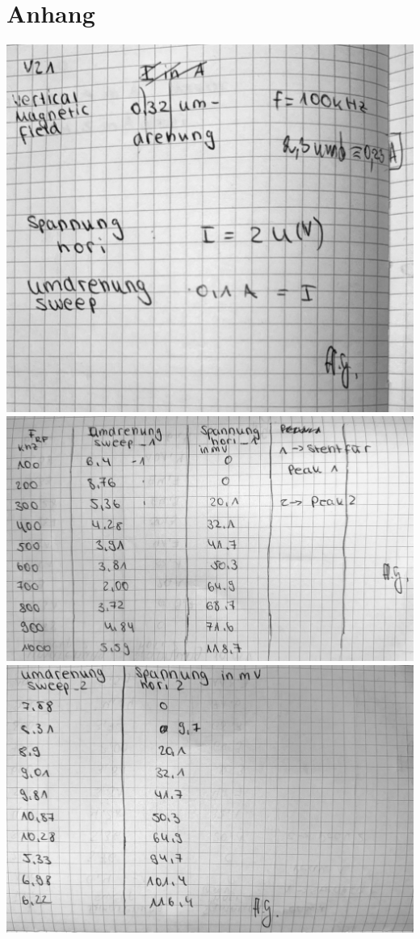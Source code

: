 \section*{Anhang}


\centering

\vfill
\includegraphics[width=0.75\linewidth]{content/messung/1.pdf}
\vfill
\newpage
\vfill
\includegraphics[width=0.75\linewidth]{content/messung/2.pdf}
\vfill
\vfill
\includegraphics[width=0.75\linewidth]{content/messung/3.pdf}
\vfill
